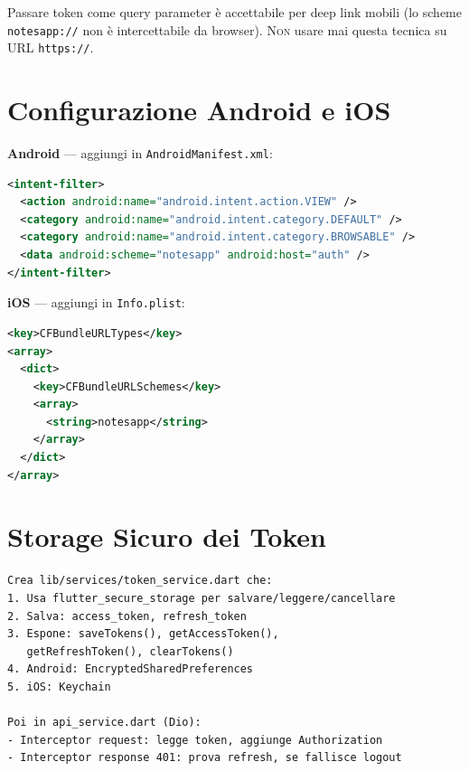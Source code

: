 \begin{warnbox}
Passare token come query parameter è accettabile per deep link mobili (lo scheme \texttt{notesapp://} non è intercettabile da browser). \textsc{Non} usare mai questa tecnica su URL \texttt{https://}.
\end{warnbox}

\section{Configurazione Android e iOS}

\textbf{Android} --- aggiungi in \texttt{AndroidManifest.xml}:
\begin{lstlisting}[language=XML]
<intent-filter>
  <action android:name="android.intent.action.VIEW" />
  <category android:name="android.intent.category.DEFAULT" />
  <category android:name="android.intent.category.BROWSABLE" />
  <data android:scheme="notesapp" android:host="auth" />
</intent-filter>
\end{lstlisting}

\textbf{iOS} --- aggiungi in \texttt{Info.plist}:
\begin{lstlisting}[language=XML]
<key>CFBundleURLTypes</key>
<array>
  <dict>
    <key>CFBundleURLSchemes</key>
    <array>
      <string>notesapp</string>
    </array>
  </dict>
</array>
\end{lstlisting}

\section{Storage Sicuro dei Token}

\begin{praticabox}[title={Pratica --- Token service}]
\begin{lstlisting}[language={}]
Crea lib/services/token_service.dart che:
1. Usa flutter_secure_storage per salvare/leggere/cancellare
2. Salva: access_token, refresh_token
3. Espone: saveTokens(), getAccessToken(),
   getRefreshToken(), clearTokens()
4. Android: EncryptedSharedPreferences
5. iOS: Keychain

Poi in api_service.dart (Dio):
- Interceptor request: legge token, aggiunge Authorization
- Interceptor response 401: prova refresh, se fallisce logout
\end{lstlisting}
\end{praticabox}

